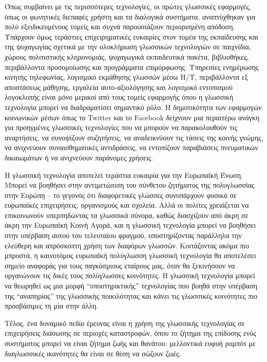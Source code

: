 \documentclass[]{../../metanetpaper}
\begin{document}
\begin{multicols}{2}
Όπως συμβαίνει με τις περισσότερες τεχνολογίες, οι πρώτες γλωσσικές εφαρμογές, όπως οι φωνητικές διεπαφές χρήστη και τα διαλογικά συστήματα, αναπτύχθηκαν για πολύ εξειδικευμένους τομείς και συχνά παρουσιάζουν περιορισμένη απόδοση. Υπάρχουν όμως τεράστιες επιχειρηματικές ευκαιρίες στον τομέα της εκπαίδευσης και της ψυχαγωγίας σχετικά με την ολοκλήρωση γλωσσικών τεχνολογιών σε παιχνίδια, χώρους πολιτιστικής κληρονομιάς, ψυχαγωγικά εκπαιδευτικά πακέτα, βιβλιοθήκες, περιβάλλοντα προσομοίωσης και προγράμματα επιμόρφωσης. Υπηρεσίες ενημέρωσης κινητής τηλεφωνίας, λογισμικό εκμάθησης γλωσσών μέσω Η/Υ, περιβάλλοντα εξ αποστάσεως μάθησης, εργαλεία αυτο-αξιολόγησης και λογισμικό εντοπισμού λογοκλοπής είναι μόνο μερικοί από τους τομείς εφαρμογής όπου η γλωσσική τεχνολογία μπορεί να διαδραματίσει σημαντικό ρόλο. Η δημοτικότητα των εφαρμογών κοινωνικών μέσων όπως το Twitter και το Facebook δείχνουν μια περαιτέρω ανάγκη για προηγμένες γλωσσικές τεχνολογίες που να μπορούν να παρακολουθούν τις αναρτήσεις, να συνοψίζουν συζητήσεις, να αναδεικνύουν τις τάσεις της κοινής γνώμης, να ανιχνεύουν συναισθηματικές αντιδράσεις, να εντοπίζουν παραβιάσεις πνευματικών δικαιωμάτων ή να ανιχνεύουν παράνομες χρήσεις.


Η γλωσσική τεχνολογία αποτελεί τεράστια ευκαιρία για την Ευρωπαϊκή Ένωση. Μπορεί να βοηθήσει στην αντιμετώπιση του σύνθετου ζητήματος της πολυγλωσσίας στην Ευρώπη – το γεγονός ότι διαφορετικές γλώσσες συνυπάρχουν φυσικά σε ευρωπαϊκές επιχειρήσεις, οργανισμούς και σχολεία. Αλλά οι πολίτες χρειάζεται να επικοινωνούν υπερπηδώντας τα γλωσσικά σύνορα, καθώς διασχίζουν από άκρη σε άκρη την Ευρωπαϊκή Κοινή Αγορά, και η γλωσσική τεχνολογία μπορεί να βοηθήσει στην υπέρβαση αυτού του τελευταίου φραγμού, υποστηρίζοντας παράλληλα την ελεύθερη και απρόσκοπτη χρήση των διαφόρων γλωσσών. Κοιτάζοντας ακόμα πιο μπροστά, η καινοτόμος ευρωπαϊκή πολύγλωσση γλωσσική τεχνολογία θα αποτελέσει σημείο αναφοράς για τους παγκόσμιους εταίρους μας, όταν θα ξεκινήσουν να οργανώνουν τις δικές τους πολύγλωσσες κοινότητες. Η γλωσσική τεχνολογία μπορεί να θεωρηθεί ως μια μορφή “υποστηρικτικής” τεχνολογίας που βοηθά στην υπέρβαση της “αναπηρίας” της γλωσσικής ποικιλότητας και κάνει τις γλωσσικές κοινότητες πιο προσβάσιμες τη μία στην άλλη.

Τέλος, ένα δυναμικό πεδίο έρευνας είναι η χρήση της γλωσσικής τεχνολογίας σε επιχειρήσεις διάσωσης σε περιοχές καταστροφών, όπου το ζήτημα της επίδοσης ενός συστήματος μπορεί να είναι ζήτημα ζωής και θανάτου: μελλοντικά ευφυή ρομπότ με διαγλωσσικές ικανότητες θα είναι σε θέση να σώζουν ζωές.


\end{multicols}
\end{document}
